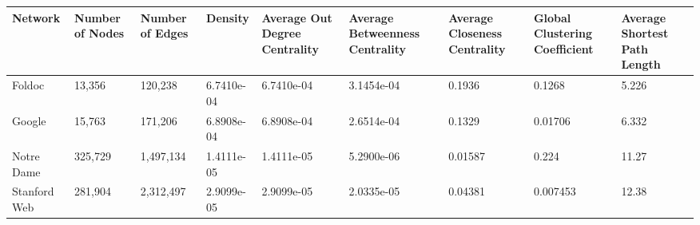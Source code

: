 \begin{tabular}{lllllllll}
\toprule
Network & Number of Nodes & Number of Edges & Density & Average Out Degree Centrality & Average Betweenness Centrality & Average Closeness Centrality & Global Clustering Coefficient & Average Shortest Path Length \\
\midrule
Foldoc & 13,356 & 120,238 & 6.7410e-04 & 6.7410e-04 & 3.1454e-04 & 0.1936 & 0.1268 & 5.226 \\
Google & 15,763 & 171,206 & 6.8908e-04 & 6.8908e-04 & 2.6514e-04 & 0.1329 & 0.01706 & 6.332 \\
Notre Dame & 325,729 & 1,497,134 & 1.4111e-05 & 1.4111e-05 & 5.2900e-06 & 0.01587 & 0.224 & 11.27 \\
Stanford Web & 281,904 & 2,312,497 & 2.9099e-05 & 2.9099e-05 & 2.0335e-05 & 0.04381 & 0.007453 & 12.38 \\
\bottomrule
\end{tabular}
